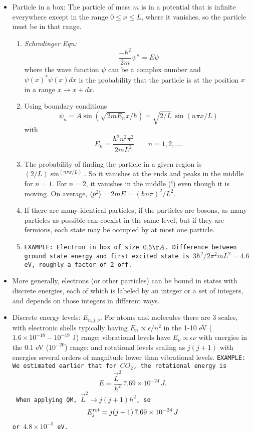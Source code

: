 \documentclass[11pt]{book}
\def\be{\begin{equation}}
\def\ee{\end{equation}}
\newcommand{\eql}[1]{\label{eq:#1}}
\newcommand\example[1]{{\tt EXAMPLE: #1}}
\newcommand\bei{\begin{itemize}}
\newcommand\eei{\end{itemize}}
\newcommand\bee{\begin{enumerate}}
\newcommand\eee{\end{enumerate}}
\begin{document}
\bei
\item Particle in a box:
The particle of mass $m$ is in a potential that is infinite everywhere except in the range $0\le x\le L$, where it vanishes, so the particle must be in that range. 
\bee
\item {\it Schrodinger Eqn:}
\be
\frac{-\hbar^2}{2m} \psi'' =E\psi
\ee
where the wave function $\psi$ can be a complex number and $\psi(x)^*\psi(x) dx$ is the probability that the particle is at the position $x$ in a range $x\rightarrow x+dx$. 
\item
Using boundary conditions
\be
\psi_n = A\sin(\sqrt{2mE_n}x/\hbar) = \sqrt{2/L}\,\sin(n\pi x/L)
\ee
with 
\be
E_n=\frac{\hbar^2n^2\pi^2}{2mL^2}\qquad n=1,2,\ldots
.\ee
\item The probability of finding the particle in a given region is $(2/L) \sin^(n\pi x/L)$. So it vanishes at the ends and peaks in the middle for $n=1$. For $n=2$, it vanishes in the middle (!) even though it is moving. On average, $\langle p^2\rangle = 2mE = (\hbar n\pi)^2/L^2$.
\item If there are many identical particles, if the particles are bosons, as many particles as possible can coexist in the same level, but if they are fermions, each state may be occupied by at most one particle.
\item \example{Electron in box of size $0.5\AA$. Difference between ground state energy and first excited state is $3\hbar^2/2\pi^2 mL^2=4.6$eV, roughly a factor of 2 off.}
\eee
\item More generally, electrons (or other particles) can be bound in states with discrete energies, each of which is labeled by an integer or a set of integers, and depends on those integers in different ways.
\item Discrete energy levels: $E_{n,j,\nu}$. For atoms and molecules there are 3 scales, with electronic shells typically having $E_n\propto \epsilon/n^2$ in the 1-10 eV ($1.6\times 10^{-18}-10^{-19}$ J) range; vibrational levels have $E_\nu\propto \epsilon \nu$ with energies in the 0.1 eV ($10^{-20}$) range; and rotational levels scaling as $j(j+1)$ with energies several orders of magnitude lower than vibrational levels.
\example{We estimated earlier that for $CO_2$, the rotational energy is
\be
E = \frac{\vec L^2}{\hbar^2} \,7.69\times 10^{-24}\, J
.\ee
When applying QM, $\vec L^2\rightarrow j(j+1)\hbar^2$, so
\be E_{j}^{\rm rot} = j(j+1) \,7.69\times 10^{-24}\, J \eql{co2rot}
\ee or $4.8\times 10^{-5}$ eV.}
\eei

\newcommand\evib{\epsilon^{\rm vib}}
\end{document}
